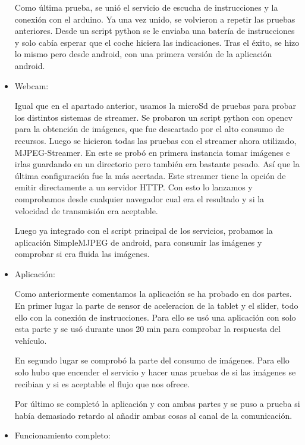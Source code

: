 \documentclass{pclass}
\begin{document}
\begin{itemize}
		Como última prueba, se unió el servicio de escucha de instrucciones y la conexión con el arduino. Ya una vez unido, se volvieron a repetir las pruebas anteriores. Desde un script python se le enviaba una batería de instrucciones y solo cabía esperar que el coche hiciera las indicaciones. Tras el éxito, se hizo lo mismo pero desde android, con una primera versión de la aplicación android.
		
	
	
	\item Webcam:
	
		Igual que en el apartado anterior, usamos la microSd de pruebas para probar los distintos sistemas de streamer. Se probaron un script python con opencv para la obtención de imágenes, que fue descartado por el alto consumo de recursos. Luego se hicieron todas las pruebas con el streamer ahora utilizado, MJPEG-Streamer. En este se probó en primera instancia tomar imágenes e irlas guardando en un directorio pero también era bastante pesado. Así que la última configuración fue la más acertada. Este streamer tiene la opción de emitir directamente a un servidor HTTP. Con esto lo lanzamos y comprobamos desde cualquier navegador cual era el resultado y si la velocidad de transmisión era aceptable.
		
		Luego ya integrado con el script principal de los servicios, probamos la aplicación SimpleMJPEG de android, para consumir las imágenes y comprobar si era fluida las imágenes.
	
	\item Aplicación:
	
		Como anteriormente comentamos la aplicación se ha probado en dos partes. En primer lugar la parte de sensor de aceleracion de la tablet y el slider, todo ello con la conexión de instrucciones. Para ello se usó una aplicación con solo esta parte y se usó durante unos 20 min para comprobar la respuesta del vehículo.
		
		En segundo lugar se comprobó la parte del consumo de imágenes. Para ello solo hubo que encender el servicio y hacer unas pruebas de si las imágenes se recibian y si es aceptable el flujo que nos ofrece.
		
		Por último se completó la aplicación y con ambas partes y se puso a prueba si había demasiado retardo al añadir ambas cosas al canal de la comunicación.
	
	\item Funcionamiento completo:
	
		
	
\end{itemize}
\end{document}

